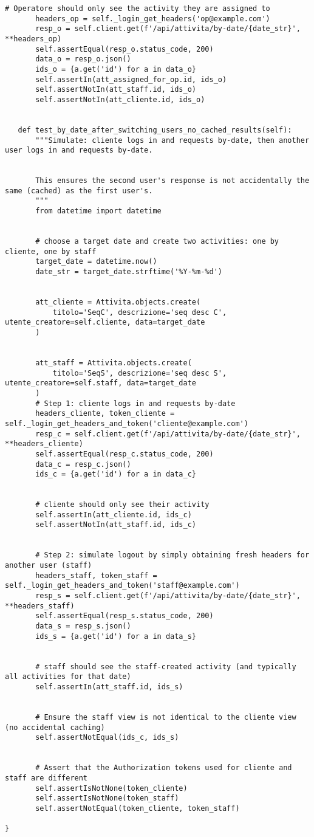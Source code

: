\documentclass[a4paper]{report}
\begin{document}
\begin{scriptsize}
\begin{lstlisting}[caption={Attivita}, label=lst:javacode]
       # Operatore should only see the activity they are assigned to
       headers_op = self._login_get_headers('op@example.com')
       resp_o = self.client.get(f'/api/attivita/by-date/{date_str}', **headers_op)
       self.assertEqual(resp_o.status_code, 200)
       data_o = resp_o.json()
       ids_o = {a.get('id') for a in data_o}
       self.assertIn(att_assigned_for_op.id, ids_o)
       self.assertNotIn(att_staff.id, ids_o)
       self.assertNotIn(att_cliente.id, ids_o)


   def test_by_date_after_switching_users_no_cached_results(self):
       """Simulate: cliente logs in and requests by-date, then another user logs in and requests by-date.


       This ensures the second user's response is not accidentally the same (cached) as the first user's.
       """
       from datetime import datetime


       # choose a target date and create two activities: one by cliente, one by staff
       target_date = datetime.now()
       date_str = target_date.strftime('%Y-%m-%d')


       att_cliente = Attivita.objects.create(
           titolo='SeqC', descrizione='seq desc C', utente_creatore=self.cliente, data=target_date
       )


       att_staff = Attivita.objects.create(
           titolo='SeqS', descrizione='seq desc S', utente_creatore=self.staff, data=target_date
       )
       # Step 1: cliente logs in and requests by-date
       headers_cliente, token_cliente = self._login_get_headers_and_token('cliente@example.com')
       resp_c = self.client.get(f'/api/attivita/by-date/{date_str}', **headers_cliente)
       self.assertEqual(resp_c.status_code, 200)
       data_c = resp_c.json()
       ids_c = {a.get('id') for a in data_c}


       # cliente should only see their activity
       self.assertIn(att_cliente.id, ids_c)
       self.assertNotIn(att_staff.id, ids_c)


       # Step 2: simulate logout by simply obtaining fresh headers for another user (staff)
       headers_staff, token_staff = self._login_get_headers_and_token('staff@example.com')
       resp_s = self.client.get(f'/api/attivita/by-date/{date_str}', **headers_staff)
       self.assertEqual(resp_s.status_code, 200)
       data_s = resp_s.json()
       ids_s = {a.get('id') for a in data_s}


       # staff should see the staff-created activity (and typically all activities for that date)
       self.assertIn(att_staff.id, ids_s)


       # Ensure the staff view is not identical to the cliente view (no accidental caching)
       self.assertNotEqual(ids_c, ids_s)


       # Assert that the Authorization tokens used for cliente and staff are different
       self.assertIsNotNone(token_cliente)
       self.assertIsNotNone(token_staff)
       self.assertNotEqual(token_cliente, token_staff)

}
\end{lstlisting}
\end{scriptsize}
\end{document}
